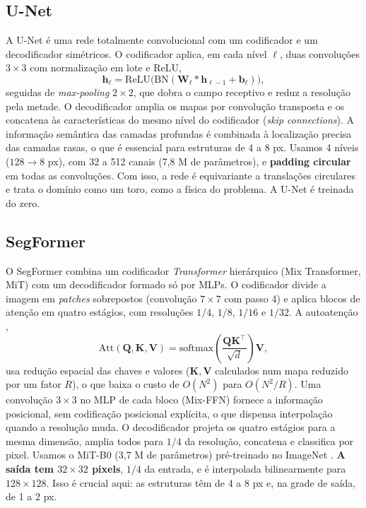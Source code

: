 \subsection{U-Net}
A U-Net \cite{ronneberger2015} é uma rede totalmente convolucional \cite{long2015fcn} com um
codificador e um decodificador simétricos. O codificador aplica, em cada nível $\ell$, duas
convoluções $3\times3$ com normalização em lote \cite{ioffe2015} e ReLU,
\begin{equation}
  \mathbf{h}_\ell = \mathrm{ReLU}\big(\mathrm{BN}(\mathbf{W}_\ell * \mathbf{h}_{\ell-1} + \mathbf{b}_\ell)\big),
\end{equation}
seguidas de \emph{max-pooling} $2\times2$, que dobra o campo receptivo e reduz a resolução pela
metade. O decodificador amplia os mapas por convolução transposta e os concatena às
características do mesmo nível do codificador (\emph{skip connections}). A informação semântica das
camadas profundas é combinada à localização precisa das camadas rasas, o que é essencial para
estruturas de 4 a 8 px. Usamos 4 níveis ($128\to8$ px), com 32 a 512 canais (7,8 M de parâmetros),
e \textbf{padding circular} em todas as convoluções. Com isso, a rede é equivariante a translações
circulares e trata o domínio como um toro, como a física do problema. A U-Net é treinada do zero.

\subsection{SegFormer}
O SegFormer \cite{xie2021segformer} combina um codificador \emph{Transformer} hierárquico
(Mix Transformer, MiT) com um decodificador formado só por MLPs. O codificador divide a imagem em
\emph{patches} sobrepostos (convolução $7\times7$ com passo 4) e aplica blocos de atenção em quatro
estágios, com resoluções $1/4$, $1/8$, $1/16$ e $1/32$. A autoatenção \cite{vaswani2017},
\begin{equation}
  \mathrm{Att}(\mathbf{Q},\mathbf{K},\mathbf{V}) = \mathrm{softmax}\!\left(\frac{\mathbf{Q}\mathbf{K}^\top}{\sqrt{d}}\right)\mathbf{V},
\end{equation}
usa redução espacial das chaves e valores ($\mathbf{K},\mathbf{V}$ calculados num mapa reduzido por
um fator $R$), o que baixa o custo de $O(N^2)$ para $O(N^2/R)$. Uma convolução $3\times3$ no MLP de
cada bloco (Mix-FFN) fornece a informação posicional, sem codificação posicional explícita, o que
dispensa interpolação quando a resolução muda. O decodificador projeta os quatro estágios para a
mesma dimensão, amplia todos para $1/4$ da resolução, concatena e classifica por pixel. Usamos o
MiT-B0 (3,7 M de parâmetros) pré-treinado no ImageNet \cite{deng2009imagenet}. \textbf{A saída tem
$32\times32$ pixels}, $1/4$ da entrada, e é interpolada bilinearmente para $128\times128$. Isso é
crucial aqui: as estruturas têm de 4 a 8 px e, na grade de saída, de 1 a 2 px.

